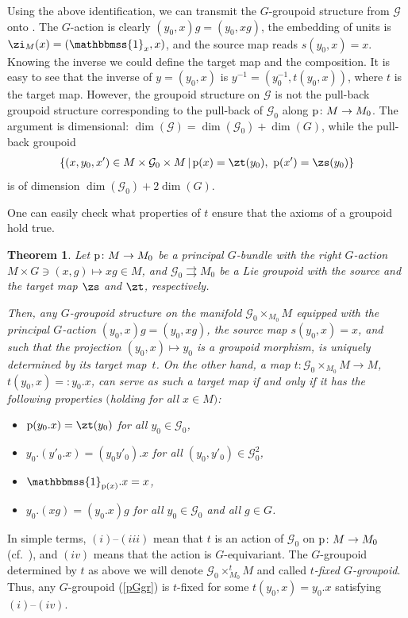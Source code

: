 \documentclass[pdftex]{sigma}
\newcommand{\Id}{\mathbbmss{1}}
\newcommand{\rmp}{\textnormal{p}}
\newcommand{\ti}{\times}
\def\cG{\mathcal{G}}
\numberwithin{equation}{section}
\newtheorem{Theorem}{Theorem}[section]
\begin{document}
Using the above identif\/ication, we can transmit the $G$-groupoid structure from $\cG$ onto \smash{$\cG_0\times_{M_0}M$}. The $G$-action is clearly $(y_0,x)g=(y_0,xg)$, the embedding of units is $\zi_M(x)=(\Id_x,x)$, and the source map reads $s(y_0,x)=x$. Knowing the inverse we could def\/ine the target map and the composition. It is easy to see that the inverse of $y=(y_0,x)$ is $y^{-1}=(y_0^{-1},t(y_0,x))$, where $t$ is the target map. However, the groupoid structure on $\cG$ is not the pull-back groupoid structure corresponding to the pull-back of $\cG_0$ along $\rmp\colon M\to M_0$. The argument is dimensional: $\dim(\cG)=\dim(\cG_0)+\dim(G)$, while the pull-back groupoid
\begin{gather*}\{(x,y_0,x')\in M\ti\cG_0\ti M\,|\, \rmp(x)=\zt(y_0),\ \rmp(x')=\zs(y_0)\}\end{gather*}
is of dimension $\dim(\cG_0)+2\dim(G)$.

One can easily check what properties of $t$ ensure that the axioms of a groupoid hold true.
\begin{Theorem}\label{generalsplit} Let $\rmp\colon M\to M_0$ be a principal $G$-bundle with the right $G$-action $M\ti G\ni(x,g)\mapsto xg\in M$, and $\cG_0\rightrightarrows M_0$ be a Lie groupoid with the source and the target map ${\zs}$ and ${\zt}$, respectively.

Then, any $G$-groupoid structure on the manifold $\cG_0\times_{M_0}M$ equipped with the principal $G$-action $(y_0,x)g=(y_0,xg)$, the source map $s(y_0,x)=x$, and such that the projection $(y_0,x)\mapsto y_0$ is a groupoid morphism, is uniquely determined by its target map~$t$. On the other hand, a map $t\colon \cG_0\times_{M_0}M\to M$, $t(y_0,x)=:y_0. x$, can serve as such a target map if and only if it has the following properties $($holding for all $x\in M)$:
\begin{itemize}\itemsep=0pt
\item[$(i)$] $\rmp(y_0.x)=\zt(y_0)$ for all $y_0\in\cG_0$,
\item[$(ii)$] $y_0.(y'_0.x)=(y_0y'_0).x$ for all $(y_0,y'_0)\in\cG_0^2$,
\item[$(iii)$] $\Id_{\rmp(x)}.x=x$,
\item[$(iv)$] $y_0.(xg)=(y_0.x)g$ for all $y_0\in\cG_0$ and all $g\in G$.
\end{itemize}
\end{Theorem}
In simple terms, $(i)$--$(iii)$ mean that $t$ is an action of $\cG_0$ on $\rmp\colon M\to M_0$ (cf.\ \cite[De\-f\/i\-ni\-tion~1.6.1]{Mackenzie2005}), and $(iv)$ means that the action is $G$-equivariant. The $G$-groupoid determined by $t$ as above we will denote $\cG_0\times_{M_0}^t M$ and called \emph{$t$-fixed $G$-groupoid}. Thus, any $G$-groupoid (\ref{pGgr}) is $t$-f\/ixed for some $t(y_0,x)=y_0.x$ satisfying $(i)$--$(iv)$.
\end{document}
